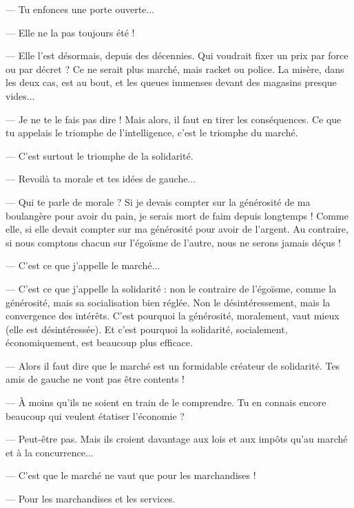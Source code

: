 — Tu enfonces une porte ouverte...

— Elle ne la pas toujours été !

— Elle l’est désormais, depuis des décennies. Qui voudrait fixer un prix par
force ou par décret ? Ce ne serait plus marché, mais racket ou police. La misère,
dans les deux cas, est au bout, et les queues immenses devant des magasins
presque vides...

— Je ne te le fais pas dire ! Mais alors, il faut en tirer les conséquences. Ce
que tu appelais le triomphe de l'intelligence, c’est le triomphe du marché.

— C’est surtout le triomphe de la solidarité.

— Revoilà ta morale et tes idées de gauche...

— Qui te parle de morale ? Si je devais compter sur la générosité de ma boulangère
pour avoir du pain, je serais mort de faim depuis longtemps ! Comme
elle, si elle devait compter sur ma générosité pour avoir de l'argent. Au
contraire, si nous comptons chacun sur l’égoïsme de l’autre, nous ne serons
jamais déçus !

— C’est ce que j'appelle le marché...

— C’est ce que j'appelle la solidarité : non le contraire de l’égoïsme, comme
la générosité, mais sa socialisation bien réglée. Non le désintéressement, mais la
convergence des intérêts. C’est pourquoi la générosité, moralement, vaut mieux
(elle est désintéressée). Et c’est pourquoi la solidarité, socialement, économiquement,
est beaucoup plus efficace.

— Alors il faut dire que le marché est un formidable créateur de solidarité.
Tes amis de gauche ne vont pas être contents !

— À moins qu’ils ne soient en train de le comprendre. Tu en connais encore
beaucoup qui veulent étatiser l’économie ?

— Peut-être pas. Mais ils croient davantage aux lois et aux impôts qu’au
marché et à la concurrence...

— C’est que le marché ne vaut que pour les marchandises !

— Pour les marchandises et les services.

